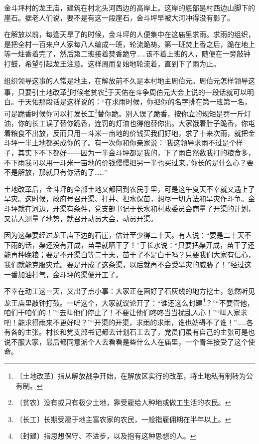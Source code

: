 \documentclass[12pt,UTF-8,openany]{ctexbook}
\begin{document}
\begin{normalsize}
    
    金斗坪村的龙王庙，建筑在村北头河西边的高岸上。这岸的底部是村西边山脚下的崖石。据老人们说，要不是有这一段崖石，金斗坪早被大河冲得没有影了。
    
    在解放以前，每逢天旱了的时候，金斗坪的人便集中在这庙里求雨。求雨的组织，是把全村一百来户人家每八人编成一班，轮流跪祷。第一班焚上香之后，跪在地上等一炷香着完了，然后第二班接着焚香跪守……该不着上班的人，随便在一旁敲钟打鼓，希望引起龙王注意。这样周而复始地轮流着，直到下了雨为止。
    
    组织领导这事的人常是地主，在解放前不久是本村地主周伯元。周伯元怎样领导这事，只要引土地改革\footnote{〔土地改革〕指从解放战争开始，在解放区实行的改革，将土地私有制转为公有制。}时候老贫农\footnote{〔贫农〕没有或只有极少土地，靠受雇给人种地或做工生活的农民。}于天佑在斗争周伯元大会上说的一段话就可以明白。于天佑那段话是这样说的：“在求雨时候，你把你的名字排在第一班第一名，可是跪香时候你可以打发长工\footnote{〔长工〕长期受雇于地主富农家的农民，一般指雇佣期在半年以上。}替你跪。别人误了跪香，按你立的规矩是罚一斤灯油，你的长工误了替你跪香，连罚的灯油也得他替你出。大家饿着肚子跪香，你屯着粮食不出放，反而只用一斗米一亩地的价钱买我们好地，求了十来次雨，就把金斗坪一半土地都买成你的了。有一次你和你亲家说：‘我这领导求雨不过是个样子，其实下不下都好——因为一半金斗坪都是我的，下了雨自然数我打的粮食多，不下雨我可以用一斗米一亩地的价钱慢慢把另一半也买过来。’你长的是什么心？要不是解放，那就只有你活的了……”
    
    土地改革后，金斗坪的全部土地又都回到农民手里，可是这午夏天不幸就又遇上了旱灾。这时候，政府号召开渠、打井、担水保苗，想尽一切方法和旱灾作斗争。金斗坪就在河边，开渠有条件，党支部书记于长水和村政委员会商量了开渠的计划，又请人测量了地势，就召开动员大会，动员开渠。
    
    因为这渠要经过龙王庙下边的石崖，估计至少得二十天。有人说：“要是二十天不下雨的话，渠还没有开成，苗早就晒干了！”于长水说：“只要把渠开成，苗干了还能再种晚粮；要是不开渠白等二十天，苗干了不是白干吗？只要我们大家有信心，我们就能克服灾荒。要是开成了这条渠，以后就再不会受旱灾的威胁了！”经过这一番加油打气，金斗坪的渠便开工了。
    
    不幸在动工这一天，又出了点小事：大家正在画好了石灰线的地方挖土，忽然听见龙王庙里敲钟打鼓。一听这个，大家就议论开了：“谁还这么封建\footnote{〔封建〕指思想保守、不进步，以及抱有这种思想的人。}？”“不要管他，咱们干咱们的！”“去叫他们停止了！不要让他们咚咚当当扰乱人心！”“叫人家求吧！能求得雨来不更好吗？”“开渠的开渠，求雨的求雨，谁也妨碍不了谁！”……各有各的主张。村长和党支部书记都去计划石工去了，党员们虽有自己的主张可是也说不服大家，最后都同意派个人去看看是些什么人在庙里，一个青年接受了这个使命。
    

\end{normalsize}
\end{document}
